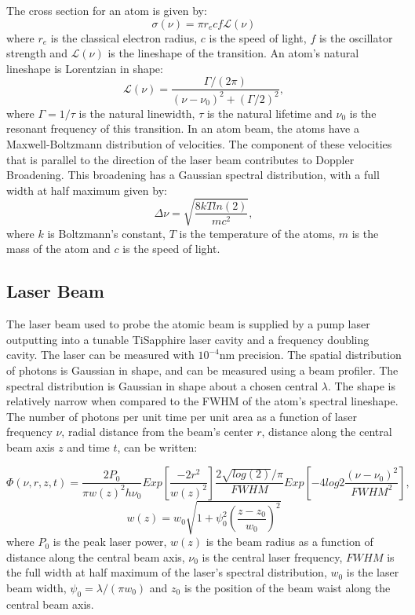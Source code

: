 \documentclass[12pt, a4paper]{article}
\begin{document}
The cross section for an atom is given by:
\begin{equation}
\sigma(\nu) = \pi r_e c f \mathscr{L}(\nu)
\end{equation}
where $r_e$ is the classical electron radius, $c$ is the speed of light, $f$ is the oscillator strength and $\mathscr{L}(\nu)$ is the lineshape of the transition. An atom's natural lineshape is Lorentzian in shape:
\begin{equation}
\mathscr{L}(\nu) = \frac{\Gamma/(2 \pi)}{(\nu-\nu_0)^2+(\Gamma/2)^2},
\end{equation}
where $\Gamma = 1/\tau$ is the natural linewidth, $\tau$ is the natural lifetime and $\nu_0$ is the resonant frequency of this transition. In an atom beam, the atoms have a Maxwell-Boltzmann distribution of velocities. The component of these velocities that is parallel to the direction of the laser beam contributes to Doppler Broadening. This broadening has a Gaussian spectral distribution, with a full width at half maximum given by:
\begin{equation}
\Delta \nu = \sqrt{\frac{8kT ln(2)}{mc^2}},
\end{equation}
where $k$ is Boltzmann's constant, $T$ is the temperature of the atoms, $m$ is the mass of the atom and $c$ is the speed of light.
\subsection{Laser Beam}
The laser beam used to probe the atomic beam is supplied by a pump laser outputting into a tunable TiSapphire laser cavity and a frequency doubling cavity. The laser can be measured with $10^{-4}$nm precision. The spatial distribution of photons is Gaussian in shape, and can be measured using a beam profiler. The spectral distribution is Gaussian in shape about a chosen central $\lambda$. The shape is relatively narrow when compared to the FWHM of the atom's spectral lineshape. The number of photons per unit time per unit area as a function of laser frequency $\nu$, radial distance from the beam's center $r$, distance along the central beam axis $z$ and time $t$, can be written:

\begin{equation}
\Phi(\nu,r,z,t) = \frac{2P_0}{\pi w(z)^2 h \nu_0} Exp[\frac{-2r^2}{w(z)^2}]\frac{2\sqrt{log(2)}/\pi}{FWHM}Exp[-4log{2}\frac{(\nu-\nu_0)^2}{FWHM^2}],
\end{equation}
\begin{equation}
w(z) = w_0\sqrt{1+\psi_0^2(\frac{z-z_0}{w_0})^2}
\end{equation}
where $P_0$ is the peak laser power, $w(z)$ is the beam radius as a function of distance along the central beam axis, $\nu_0$ is the central laser frequency, $FWHM$ is the full width at half maximum of the laser's spectral distribution, $w_0$ is the laser beam width, $\psi_0 = \lambda/(\pi w_0)$ and $z_0$ is the position of the beam waist along the central beam axis.
\end{document}
